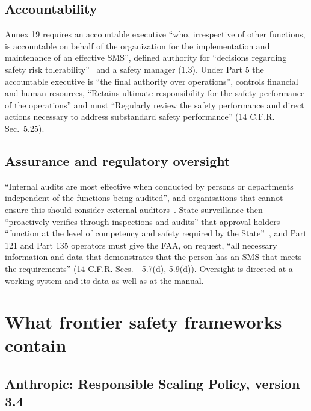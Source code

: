 \documentclass[11pt]{article}
\begin{document}
\subsection{Accountability}\label{sec:accountability}

Annex 19 requires an accountable executive ``who, irrespective of other functions, is accountable on behalf of the organization for the implementation and maintenance of an effective SMS'', defined authority for ``decisions regarding safety risk tolerability''~\cite[Appendix~2, 1.2]{icao2016annex19} and a safety manager (1.3). Under Part 5 the accountable executive is ``the final authority over operations'', controls financial and human resources, ``Retains ultimate responsibility for the safety performance of the operations'' and must ``Regularly review the safety performance and direct actions necessary to address substandard safety performance'' (14 C.F.R. Sec.~5.25).

\subsection{Assurance and regulatory oversight}\label{sec:assurance}

``Internal audits are most effective when conducted by persons or departments independent of the functions being audited'', and organisations that cannot ensure this should consider external auditors~\cite[9.5.4.3 to 9.5.4.4]{icao2018doc9859}. State surveillance then ``proactively verifies through inspections and audits'' that approval holders ``function at the level of competency and safety required by the State''~\cite[definitions]{icao2018doc9859}, and Part 121 and Part 135 operators must give the FAA, on request, ``all necessary information and data that demonstrates that the person has an SMS that meets the requirements'' (14 C.F.R. Secs.~~5.7(d), 5.9(d)). Oversight is directed at a working system and its data as well as at the manual.

\section{What frontier safety frameworks contain}\label{sec:frameworks}

\subsection{Anthropic: Responsible Scaling Policy, version 3.4}\label{sec:rsp}
\end{document}
